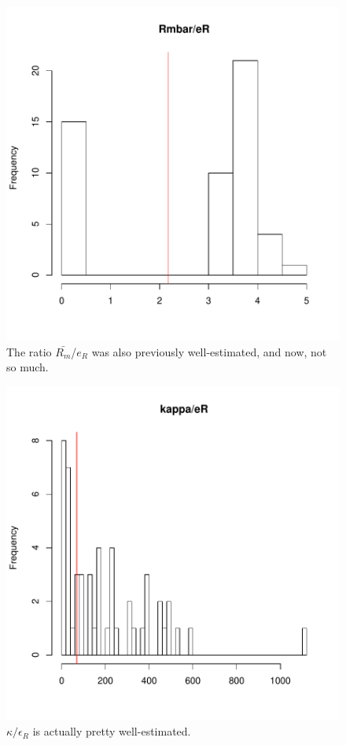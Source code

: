 \documentclass[12pt,reqno,final]{amsart}
\theoremstyle{plain}
\numberwithin{equation}{part}
\begin{document}
\begin{figure}
\includegraphics{Solving_the_problem_of_parameter_covariation_4-006}
\caption{The ratio $\bar{R_m}$/$e_R$ was also previously well-estimated, and
now, not so much.}
\end{figure}


\begin{figure}
\includegraphics{Solving_the_problem_of_parameter_covariation_4-007}
\caption{$\kappa/\epsilon_R$ is actually pretty well-estimated.}
\end{figure}
\end{document}
